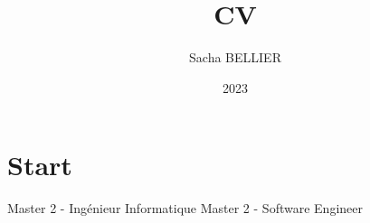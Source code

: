 \documentclass[classiclight]{CV}
\title{CV}
\author{Sacha BELLIER}
\date{2023}
\begin{document}
%
\ifheader
    \section*{Start}
        {
            \cvheadertext
            {
                Master 2 - Ingénieur Informatique 
            }
            {
                Master 2 -  Software Engineer
            }
        }
    
    \vspace{1.4cm}
\fi
\end{document}
